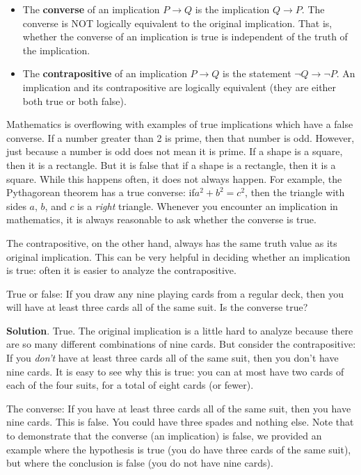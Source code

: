 \documentclass[11pt,]{book}
\newcommand{\terminology}[1]{\textbf{#1}}
\theoremstyle{ptxplainnotitle}
\theoremstyle{ptxplaintitle}
\theoremstyle{ptxdefinitionnotitle}
\theoremstyle{ptxdefinitiontitle}
\theoremstyle{ptxdefinitionnotitle}
\theoremstyle{ptxdefinitiontitle}
\theoremstyle{ptxdefinitionnotitle}
\theoremstyle{ptxdefinitiontitle}
\theoremstyle{ptxdefinitiontitlenonumber}
\theoremstyle{ptxdefinitiontitlenonumber}
\numberwithin{equation}{chapter}
\newcommand{\imp}{\rightarrow}
\begin{document}
\begin{assemblage}\label{assemblage-29}
\hypertarget{p-1835}{}%
%
\begin{itemize}[label=\textbullet]
\item{}\hypertarget{p-1836}{}%
The \terminology{converse}  of an implication \(P \imp Q\) is the implication \(Q \imp P\). The converse is NOT logically equivalent to the original implication.  That is, whether the converse of an implication is true is independent of the truth of the implication.%
\item{}\hypertarget{p-1837}{}%
The \terminology{contrapositive}  of an implication \(P \imp Q\) is the statement \(\neg Q \imp \neg P\). An implication and its contrapositive are logically equivalent (they are either both true or both false).%
\end{itemize}
%
\end{assemblage}
\hypertarget{p-1838}{}%
Mathematics is overflowing with examples of true implications which have a false converse. If a number greater than 2 is prime, then that number is odd. However, just because a number is odd does not mean it is prime. If a shape is a square, then it is a rectangle. But it is false that if a shape is a rectangle, then it is a square. While this happens often, it does not always happen. For example, the Pythagorean theorem has a true converse: if\(a^2 + b^2 = c^2\), then the triangle with sides \(a\), \(b\), and \(c\) is a \emph{right} triangle. Whenever you encounter an implication in mathematics, it is always reasonable to ask whether the converse is true.%
\par
\hypertarget{p-1839}{}%
The contrapositive, on the other hand, always has the same truth value as its original implication. This can be very helpful in deciding whether an implication is true: often it is easier to analyze the contrapositive.%
\begin{example}\label{example-51}
\hypertarget{p-1840}{}%
True or false: If you draw any nine playing cards from a regular deck, then you will have at least three cards all of the same suit. Is the converse true?%
\par\smallskip%
\noindent\textbf{Solution}.\hypertarget{solution-233}{}\quad%
\hypertarget{p-1841}{}%
True. The original implication is a little hard to analyze because there are so many different combinations of nine cards. But consider the contrapositive: If you \emph{don't} have at least three cards all of the same suit, then you don't have nine cards. It is easy to see why this is true: you can at most have two cards of each of the four suits, for a total of eight cards (or fewer).%
\par
\hypertarget{p-1842}{}%
The converse: If you have at least three cards all of the same suit, then you have nine cards. This is false. You could have three spades and nothing else. Note that to demonstrate that the converse (an implication) is false, we provided an example where the hypothesis is true (you do have three cards of the same suit), but where the conclusion is false (you do not have nine cards).%
\end{example}
\end{document}
